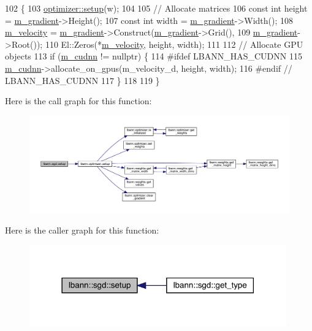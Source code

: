 \begin{DoxyCode}
102                           \{
103   \hyperlink{classlbann_1_1optimizer_a7641a88b3c166df2d974a298622b992b}{optimizer::setup}(w);
104 
105   \textcolor{comment}{// Allocate matrices}
106   \textcolor{keyword}{const} \textcolor{keywordtype}{int} height = \hyperlink{classlbann_1_1optimizer_a3df20cb0ae2b60430ad4fd235d66c12e}{m\_gradient}->Height();
107   \textcolor{keyword}{const} \textcolor{keywordtype}{int} width = \hyperlink{classlbann_1_1optimizer_a3df20cb0ae2b60430ad4fd235d66c12e}{m\_gradient}->Width();
108   \hyperlink{classlbann_1_1sgd_a27f2d893014cef8357edffb63bf649f0}{m\_velocity} = \hyperlink{classlbann_1_1optimizer_a3df20cb0ae2b60430ad4fd235d66c12e}{m\_gradient}->Construct(\hyperlink{classlbann_1_1optimizer_a3df20cb0ae2b60430ad4fd235d66c12e}{m\_gradient}->Grid(),
109                                      \hyperlink{classlbann_1_1optimizer_a3df20cb0ae2b60430ad4fd235d66c12e}{m\_gradient}->Root());
110   El::Zeros(*\hyperlink{classlbann_1_1sgd_a27f2d893014cef8357edffb63bf649f0}{m\_velocity}, height, width);
111 
112   \textcolor{comment}{// Allocate GPU objects}
113   \textcolor{keywordflow}{if} (\hyperlink{classlbann_1_1optimizer_a2f24dbeaca18b06f4aa7d179bbf96680}{m\_cudnn} != \textcolor{keyword}{nullptr}) \{
114 \textcolor{preprocessor}{#ifdef LBANN\_HAS\_CUDNN}
115     \hyperlink{classlbann_1_1optimizer_a2f24dbeaca18b06f4aa7d179bbf96680}{m\_cudnn}->allocate\_on\_gpus(m\_velocity\_d, height, width);
116 \textcolor{preprocessor}{#endif // LBANN\_HAS\_CUDNN}
117   \}
118   
119 \}
\end{DoxyCode}
Here is the call graph for this function\+:\nopagebreak
\begin{figure}[H]
\begin{center}
\leavevmode
\includegraphics[width=350pt]{classlbann_1_1sgd_a616c3cfd457ae1e771710b481b4c1bbb_cgraph}
\end{center}
\end{figure}
Here is the caller graph for this function\+:\nopagebreak
\begin{figure}[H]
\begin{center}
\leavevmode
\includegraphics[width=314pt]{classlbann_1_1sgd_a616c3cfd457ae1e771710b481b4c1bbb_icgraph}
\end{center}
\end{figure}
